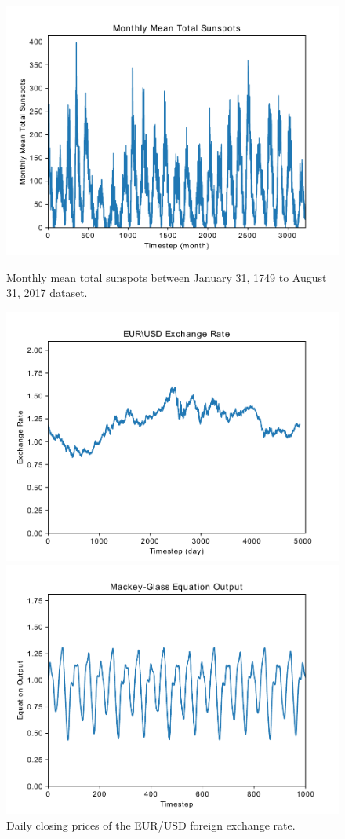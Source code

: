 \documentclass{article}
\begin{document}
\begin{figure}
\centering
{}
	\centering
  \includegraphics[scale=0.28]{imgs/sunspots.pdf}
  \caption{Monthly mean total sunspots between January 31, 1749 to August 31, 2017 dataset.}\label{fig:sunspots_dataset}
\endminipage\hfill
{}
	\centering
  \includegraphics[scale=0.28]{imgs/eurusd.pdf}
  \caption{Daily closing prices of the EUR/USD foreign exchange rate.}\label{fig:eurusd_dataset}
\endminipage\hfill
{}
	\centering
  \includegraphics[scale=0.28]{imgs/mackey.pdf}

\end{figure}
\end{document}
